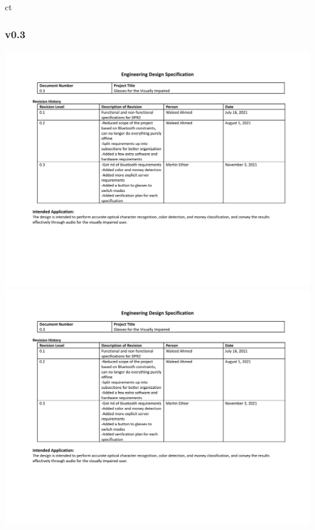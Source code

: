 ct\documentclass[a4paper,11pt]{article}
\begin{document}
\begin{landscape}
    \subsubsection{v0.3}
    \label{eds-0.3}
    \begin{center}
        \includegraphics[page=1,width={0.86\linewidth}]{pdf/eds_0.3.pdf}
        \newpage
        \includegraphics[page=2,width={0.86\linewidth}]{pdf/eds_0.3.pdf}
        \newpage

\end{center}
\end{landscape}
\end{document}
